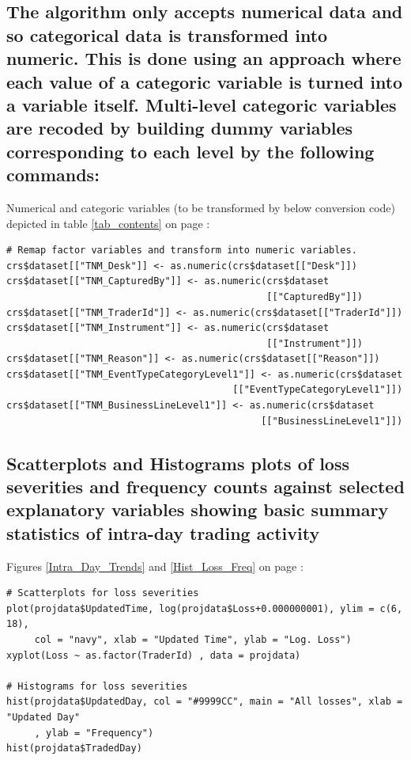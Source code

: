 \documentclass{DissertateUSU}
\begin{document}
\normalsize

\subsection{The algorithm only accepts numerical data and so categorical data is transformed into numeric. This is done using an approach where each value of a categoric variable is turned into a variable itself. Multi-level categoric variables are recoded by building dummy variables corresponding to each level by the following commands:}
\label{ssec:Transforming to dummy variables}

Numerical and categoric variables (to be transformed by below conversion
code) depicted in table \ref{tab_contents} on page
\pageref{tab_contents}:

\small

\begin{verbatim}
# Remap factor variables and transform into numeric variables.
crs$dataset[["TNM_Desk"]] <- as.numeric(crs$dataset[["Desk"]])
crs$dataset[["TNM_CapturedBy"]] <- as.numeric(crs$dataset
                                              [["CapturedBy"]])
crs$dataset[["TNM_TraderId"]] <- as.numeric(crs$dataset[["TraderId"]])
crs$dataset[["TNM_Instrument"]] <- as.numeric(crs$dataset
                                              [["Instrument"]])
crs$dataset[["TNM_Reason"]] <- as.numeric(crs$dataset[["Reason"]])
crs$dataset[["TNM_EventTypeCategoryLevel1"]] <- as.numeric(crs$dataset
                                        [["EventTypeCategoryLevel1"]])
crs$dataset[["TNM_BusinessLineLevel1"]] <- as.numeric(crs$dataset
                                             [["BusinessLineLevel1"]])
\end{verbatim}

\normalsize

\subsection{Scatterplots and Histograms plots of loss severities and frequency counts against selected explanatory variables showing basic
summary statistics of intra-day trading activity}
\label{ssec:Scatterplots and Histograms of intra-day trading activity}

Figures \ref{Intra_Day_Trends} and \ref{Hist_Loss_Freq} on page
\pageref{Hist_Loss_Freq}:

\small

\begin{verbatim}
# Scatterplots for loss severities
plot(projdata$UpdatedTime, log(projdata$Loss+0.000000001), ylim = c(6, 18),
     col = "navy", xlab = "Updated Time", ylab = "Log. Loss")
xyplot(Loss ~ as.factor(TraderId) , data = projdata)

# Histograms for loss severities
hist(projdata$UpdatedDay, col = "#9999CC", main = "All losses", xlab = "Updated Day"
     , ylab = "Frequency")
hist(projdata$TradedDay)
\end{verbatim}
\end{document}
